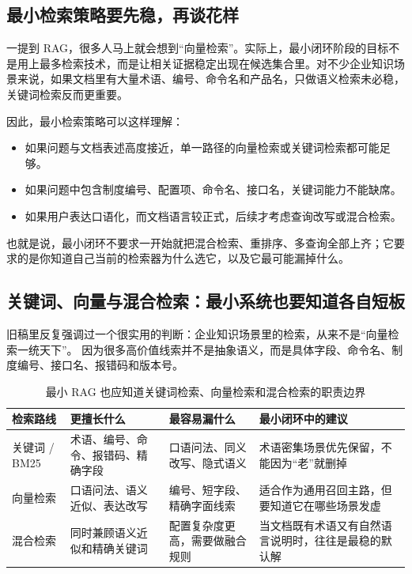 \subsection{最小检索策略要先稳，再谈花样}
一提到 RAG，很多人马上就会想到“向量检索”。实际上，最小闭环阶段的目标不是用上最多检索技术，而是让相关证据稳定出现在候选集合里。对不少企业知识场景来说，如果文档里有大量术语、编号、命令名和产品名，只做语义检索未必稳，关键词检索反而更重要。

因此，最小检索策略可以这样理解：
\begin{itemize}
  \item 如果问题与文档表述高度接近，单一路径的向量检索或关键词检索都可能足够。
  \item 如果问题中包含制度编号、配置项、命令名、接口名，关键词能力不能缺席。
  \item 如果用户表达口语化，而文档语言较正式，后续才考虑查询改写或混合检索。
\end{itemize}

也就是说，最小闭环不要求一开始就把混合检索、重排序、多查询全部上齐；它要求的是你知道自己当前的检索器为什么选它，以及它最可能漏掉什么。

\subsection{关键词、向量与混合检索：最小系统也要知道各自短板}
旧稿里反复强调过一个很实用的判断：{\heiti 企业知识场景里的检索，从来不是“向量检索一统天下”。} 因为很多高价值线索并不是抽象语义，而是具体字段、命令名、制度编号、接口名、报错码和版本号。

\begin{table}[H]
\centering
\small
\begin{tabularx}{\textwidth}{>{\raggedright\arraybackslash}p{2.6cm}>{\raggedright\arraybackslash}p{3cm}>{\raggedright\arraybackslash}p{2.8cm}>{\raggedright\arraybackslash}X}
\toprule
\textbf{检索路线} & \textbf{更擅长什么} & \textbf{最容易漏什么} & \textbf{最小闭环中的建议} \\
\midrule
关键词 / BM25 & 术语、编号、命令、报错码、精确字段 & 口语问法、同义改写、隐式语义 & 术语密集场景优先保留，不能因为“老”就删掉 \\
向量检索 & 口语问法、语义近似、表达改写 & 编号、短字段、精确字面线索 & 适合作为通用召回主路，但要知道它在哪些场景发虚 \\
混合检索 & 同时兼顾语义近似和精确关键词 & 配置复杂度更高，需要做融合规则 & 当文档既有术语又有自然语言说明时，往往是最稳的默认解 \\
\bottomrule
\end{tabularx}
\caption{最小 RAG 也应知道关键词检索、向量检索和混合检索的职责边界}
\label{tab:retrieval-route-choice}
\end{table}

